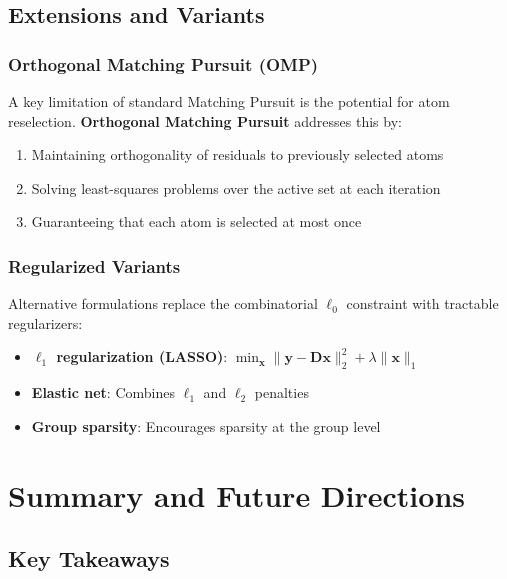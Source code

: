 \documentclass[12pt]{article}
\begin{document}
\subsection{Extensions and Variants}

\subsubsection{Orthogonal Matching Pursuit (OMP)}

A key limitation of standard Matching Pursuit is the potential for atom reselection. \textbf{Orthogonal Matching Pursuit} addresses this by:
\begin{enumerate}
    \item Maintaining orthogonality of residuals to previously selected atoms
    \item Solving least-squares problems over the active set at each iteration
    \item Guaranteeing that each atom is selected at most once
\end{enumerate}

\subsubsection{Regularized Variants}

Alternative formulations replace the combinatorial $\ell_0$ constraint with tractable regularizers:
\begin{itemize}
    \item \textbf{$\ell_1$ regularization (LASSO)}: $\min_{\mathbf{x}} \|\mathbf{y} - \mathbf{D}\mathbf{x}\|_2^2 + \lambda \|\mathbf{x}\|_1$
    \item \textbf{Elastic net}: Combines $\ell_1$ and $\ell_2$ penalties
    \item \textbf{Group sparsity}: Encourages sparsity at the group level
\end{itemize}

\newpage

\section{Summary and Future Directions}

\subsection{Key Takeaways}
\end{document}
